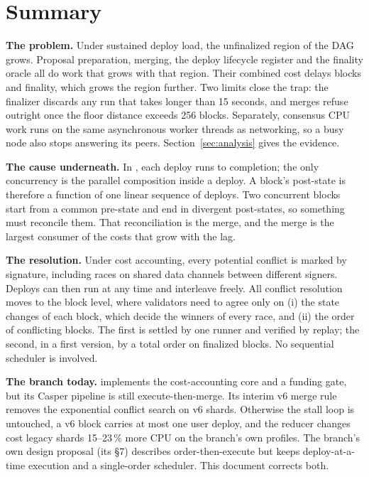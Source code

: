 \documentclass[11pt]{article}
\newcommand{\code}{\path}
\begin{document}
\tableofcontents
\newpage

\section{Summary}

\textbf{The problem.} Under sustained deploy load, the unfinalized region of the DAG grows. Proposal preparation, merging, the deploy lifecycle register and the finality oracle all do work that grows with that region. Their combined cost delays blocks and finality, which grows the region further. Two limits close the trap: the finalizer discards any run that takes longer than 15 seconds, and merges refuse outright once the floor distance exceeds 256 blocks. Separately, consensus CPU work runs on the same asynchronous worker threads as networking, so a busy node also stops answering its peers. Section~\ref{sec:analysis} gives the evidence.

\textbf{The cause underneath.} In \code{dev}, each deploy runs to completion; the only concurrency is the parallel composition inside a deploy. A block's post-state is therefore a function of one linear sequence of deploys. Two concurrent blocks start from a common pre-state and end in divergent post-states, so something must reconcile them. That reconciliation is the merge, and the merge is the largest consumer of the costs that grow with the lag.

\textbf{The resolution.} Under cost accounting, every potential conflict is marked by signature, including races on shared data channels between different signers. Deploys can then run at any time and interleave freely. All conflict resolution moves to the block level, where validators need to agree only on (i) the state changes of each block, which decide the winners of every race, and (ii) the order of conflicting blocks. The first is settled by one runner and verified by replay; the second, in a first version, by a total order on finalized blocks. No sequential scheduler is involved.

\textbf{The branch today.} \code{feature/cost-accounted-rho} implements the cost-accounting core and a funding gate, but its Casper pipeline is still execute-then-merge. Its interim v6 merge rule removes the exponential conflict search on v6 shards. Otherwise the stall loop is untouched, a v6 block carries at most one user deploy, and the reducer changes cost legacy shards 15--23\,\% more CPU on the branch's own profiles. The branch's own design proposal (its \S7) describes order-then-execute but keeps deploy-at-a-time execution and a single-order scheduler. This document corrects both.
\end{document}
